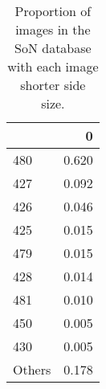 \begin{table}
\caption{Proportion of images in the SoN database with each image shorter side size.}
\label{tab:SoNImageShortSize}
\begin{tabular}{lr}
\toprule
 & 0 \\
\midrule
480 & 0.620 \\
427 & 0.092 \\
426 & 0.046 \\
425 & 0.015 \\
479 & 0.015 \\
428 & 0.014 \\
481 & 0.010 \\
450 & 0.005 \\
430 & 0.005 \\
Others & 0.178 \\
\bottomrule
\end{tabular}
\end{table}
